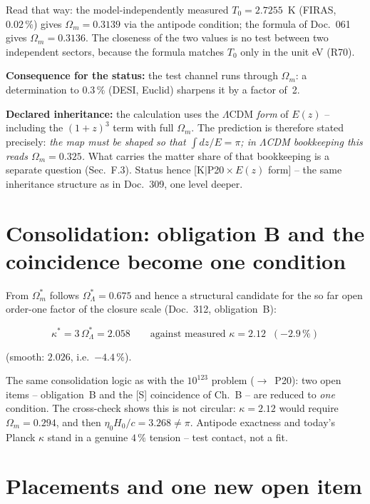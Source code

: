 Read that way: the model-independently measured
$T_0 = 2.7255$~K (FIRAS, $0.02\,\%$) gives $\Omega_m = 0.3139$
via the antipode condition; the formula of Doc.~061 gives
$\Omega_m = 0.3136$. The closeness of the two values is no test
between two independent sectors, because the formula matches $T_0$
only in the unit eV (R70).

\textbf{Consequence for the status:} the test channel runs
through $\Omega_m$: a determination to $0.3\,\%$ (DESI, Euclid)
sharpens it by a factor of~2.

\textbf{Declared inheritance:} the calculation uses the
$\Lambda$CDM \emph{form} of $E(z)$ -- including the $(1{+}z)^3$
term with full $\Omega_m$. The prediction is therefore stated
precisely: \emph{the map must be shaped so that
$\int dz/E = \pi$; in $\Lambda$CDM bookkeeping this reads
$\Omega_m = 0.325$.} What carries the matter share of that
bookkeeping is a separate question (Sec.~F.3). Status hence
[K$|$P20\,$\times$\,$E(z)$ form] -- the same inheritance
structure as in Doc.~309, one level deeper.

\section{Consolidation: obligation B and the coincidence become
one condition}

From $\Omega_m^{*}$ follows $\Omega_\Lambda^{*} = 0.675$ and
hence a structural candidate for the so far open order-one factor
of the closure scale (Doc.~312, obligation~B):

\begin{equation}
  \kappa^{*} = 3\,\Omega_\Lambda^{*} = 2.058
  \qquad\text{against measured } \kappa = 2.12
  \;\;(-2.9\,\%)
\end{equation}

\noindent (smooth: $2.026$, i.e.\ $-4.4\,\%$).

The same consolidation logic as with the $10^{123}$ problem
($\to$~P20): two open items -- obligation~B and the [S]
coincidence of Ch.~B -- are reduced to \emph{one} condition. The
cross-check shows this is not circular: $\kappa = 2.12$ would
require $\Omega_m = 0.294$, and then
$\eta_0 H_0/c = 3.268 \ne \pi$. Antipode exactness and today's
Planck $\kappa$ stand in a genuine $4\,\%$ tension -- test
contact, not a fit.

\section{Placements and one new open item}

